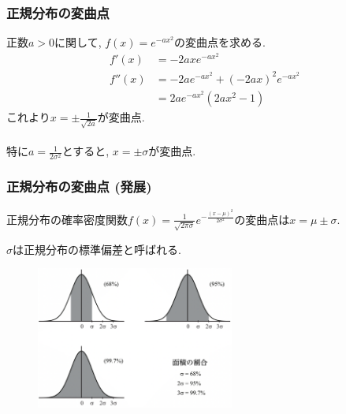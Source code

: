 


\begin{frame}
\frametitle{正規分布の変曲点}

正数$a>0$に関して, $f(x)=e^{-ax^2}$の変曲点を求める. 
\begin{align*}
f'(x) & = -2axe^{-ax^2} \\
f''(x) & = -2ae^{-ax^2} + (-2ax)^2e^{-ax^2} \\
&= 2ae^{-ax^2} (2ax^2-1)
\end{align*}
これより$x=\pm \frac{1}{\sqrt{2a}}$が変曲点. \\
\ \\

特に$a=\frac{1}{2\sigma^2}$とすると, $x=\pm \sigma$が変曲点. 

\end{frame}







\begin{frame}
\frametitle{正規分布の変曲点 (発展)}

\begin{Thm}
正規分布の確率密度関数$f(x)=\frac{1}{\sqrt{2 \pi \sigma}}e^{-\frac{(x-\mu)^2}{2\sigma^2}}$の変曲点は$x=\mu \pm \sigma$. 
\end{Thm}
$\sigma$は正規分布の標準偏差と呼ばれる. 


 \begin{figure}[htbp]
 \begin{center} 
  \includegraphics[width=65mm]{calculus7/normal_sigma.png}
 \end{center}
\end{figure}

\end{frame}

